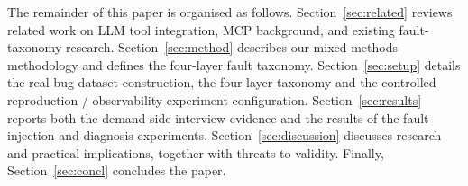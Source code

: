 The remainder of this paper is organised as follows.
Section~\ref{sec:related} reviews related work on LLM tool integration, MCP background, and
existing fault-taxonomy research.
Section~\ref{sec:method} describes our mixed-methods methodology and defines the four-layer
fault taxonomy.
Section~\ref{sec:setup} details the real-bug dataset construction, the four-layer taxonomy
and the controlled reproduction / observability experiment configuration.
Section~\ref{sec:results} reports both the demand-side interview evidence and the results
of the fault-injection and diagnosis experiments.
Section~\ref{sec:discussion} discusses research and practical implications, together with
threats to validity.
Finally, Section~\ref{sec:concl} concludes the paper.